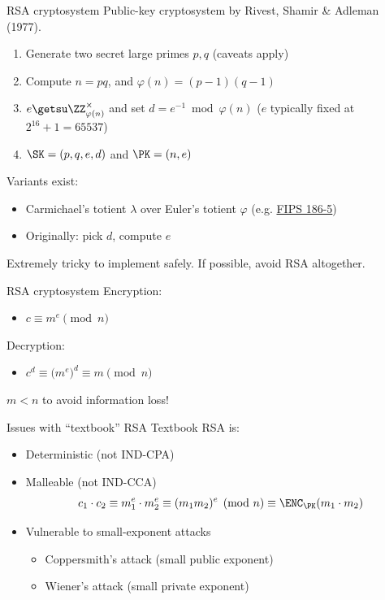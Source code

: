 \begin{frame}{RSA cryptosystem}
  Public-key cryptosystem by Rivest, Shamir \& Adleman (1977).
  
  \begin{enumerate}[<+(1)->]
    \item Generate two secret large primes $p,q$ (caveats apply)
    \item Compute $n=pq$, and $\varphi(n)=(p-1)(q-1)$
    \item $e \getsu \ZZ_{\varphi(n)}^\times$ and set $d = e^{-1} \bmod \varphi(n)$ {\scriptsize ($e$ typically fixed at $2^{16} + 1 = 65537$)}
    \item $\SK=(p,q,e,d)$ and $\PK = (n,e)$
  \end{enumerate}

  \pause
  Variants exist:
  \begin{itemize}[<+(1)->]
    \item Carmichael's totient $\lambda$ over Euler's totient $\varphi$ (e.g. \href{https://csrc.nist.gov/pubs/fips/186-5/final}{FIPS 186-5})
    \item Originally: pick $d$, compute $e$
  \end{itemize}

  \pause
  Extremely tricky to implement safely.
  If possible, avoid RSA altogether.
\end{frame}

\begin{frame}{RSA cryptosystem}
  Encryption:
  \pause
  \begin{itemize}
    \item $c \equiv m^e \pmod{n}$
  \end{itemize}

  \pause
  Decryption:
  \pause
  \begin{itemize}
    \item $c^d \equiv \bigl(m^e\bigr)^d \equiv m \pmod{n}$
  \end{itemize}

  \vspace*{1em}

  \pause
  $m < n$ to avoid information loss!
\end{frame}

\begin{frame}{Issues with \enquote{textbook} RSA}
  Textbook RSA is:
  \begin{itemize}[<+(1)->]
    \item Deterministic (not IND-CPA)
    \item Malleable (not IND-CCA)
    \[
      c_1 \cdot c_2 \equiv m_1^e \cdot m_2^e \equiv (m_1m_2)^e \pmod{n} \equiv \ENC_\PK(m_1 \cdot m_2)
    \]
    \item Vulnerable to small-exponent attacks
    \par
    \begin{itemize}
      \item Coppersmith's attack (small public exponent)
      \item Wiener's attack (small private exponent)
    \end{itemize}
  \end{itemize}
\end{frame}

